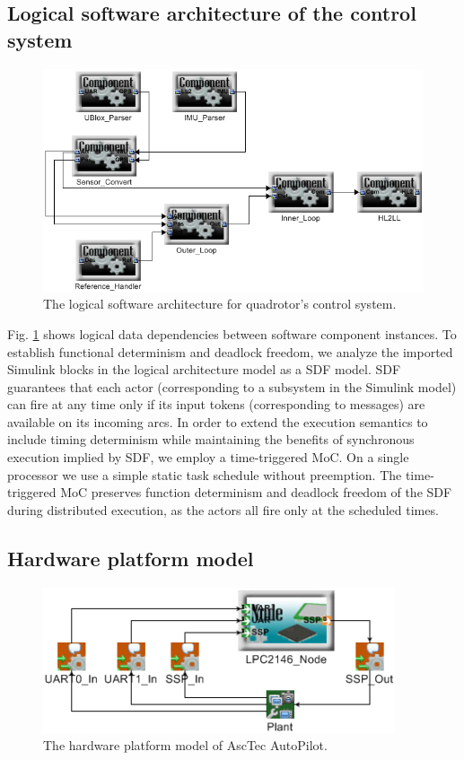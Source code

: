 \documentclass{acm_proc_article-sp}
\begin{document}
\subsection{Logical software architecture of the control system}

\begin{figure}[!t]
\centering
\includegraphics[width=\columnwidth]{figures/QuadrotorLogicalSoftwareArchitecture.png}
\caption{The logical software architecture for quadrotor's control system.}
\label{fig:QuadrotorLogicalSoftwareArchitecture}
\end{figure}

Fig. \ref{fig:QuadrotorLogicalSoftwareArchitecture} shows logical data dependencies between software component instances. To establish functional determinism and deadlock freedom, we analyze the imported Simulink blocks in the logical architecture model as a SDF model. SDF guarantees that each actor (corresponding to a subsystem in the Simulink model) can fire at any time only if its input tokens (corresponding to messages) are available on its incoming arcs. In order to extend the execution semantics to include timing determinism while maintaining the benefits of synchronous execution implied by SDF, we employ a time-triggered MoC. On a single processor we use a simple static task schedule without preemption. The time-triggered MoC preserves function determinism and deadlock freedom of the SDF during distributed execution, as the actors all fire only at the scheduled times.

\subsection{Hardware platform model}

\begin{figure}[!t]
\centering
\includegraphics[width=0.80\columnwidth]{figures/QuadrotorHardwarePlatform.png}
\caption{The hardware platform model of AscTec AutoPilot.}
\label{fig:QuadrotorHardwarePlatform}
\end{figure}
\end{document}
